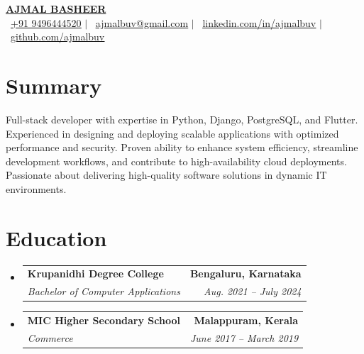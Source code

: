 \documentclass[a4paper,11pt]{article}
\makeatletter
\newcommand{\resumeSubheading}[4]{
	\vspace{-2pt}\item
		\begin{tabular*}{0.97\textwidth}[t]{l@{\extracolsep{\fill}}r}
			\textbf{#1} & \textbf{\small #2} \\
			\textit{\small#3} & \textit{\small #4} \\
		\end{tabular*}\vspace{-7pt}
}
\newcommand{\resumeSubHeadingListStart}{\begin{itemize}[leftmargin=0.15in, label={}]}
\newcommand{\resumeSubHeadingListEnd}{\end{itemize}}
\makeatother
\begin{document}
\begin{center}
	{\selectfont \textbf{\Huge \scshape \href{https://ajmalbuv.pages.dev}{AJMAL BASHEER}}} \\ \vspace{1pt}
	\small{
		\raisebox{-0.1\height}\faPhone\ \href{tel:+919496444520}{\underline{+91 9496444520}} $|$
		\raisebox{-0.2\height}\faEnvelope\ \href{mailto:ajmalbuv@gmail.com}{\underline{ajmalbuv@gmail.com}} $|$
		\raisebox{-0.2\height}\faLinkedin\ \href{https://linkedin.com/in/ajmalbuv}{\underline{linkedin.com/in/ajmalbuv}} $|$
		\raisebox{-0.2\height}\faGithub\ \href{https://github.com/ajmalbuv}{\underline{github.com/ajmalbuv}}
	}
\end{center}

\section{Summary}
\begin{itemize}[leftmargin=0.15in, label={}]
	\small{\item{
				Full-stack developer with expertise in Python, Django, PostgreSQL, and Flutter. Experienced in designing and deploying scalable applications with optimized performance and security. Proven ability to enhance system efficiency, streamline development workflows, and contribute to high-availability cloud deployments. Passionate about delivering high-quality software solutions in dynamic IT environments.
				}}
\end{itemize}
\section{Education}
\resumeSubHeadingListStart
\resumeSubheading
{Krupanidhi Degree College}{Bengaluru, Karnataka}
{Bachelor of Computer Applications}{Aug. 2021 -- July 2024}
\resumeSubheading
{MIC Higher Secondary School}{Malappuram, Kerala}
{Commerce}{June 2017 -- March 2019}
\resumeSubHeadingListEnd

\end{document}
